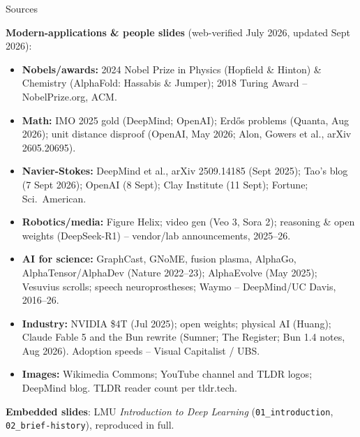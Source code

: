 \documentclass[aspectratio=43]{beamer}
\begin{document}
\begin{frame}{Sources}
  {\scriptsize
  \textbf{Modern-applications \& people slides} (web-verified July 2026, updated Sept 2026):
  \begin{itemize}\scriptsize
    \item \textbf{Nobels/awards:} 2024 Nobel Prize in Physics (Hopfield \& Hinton) \& Chemistry
      (AlphaFold: Hassabis \& Jumper); 2018 Turing Award -- NobelPrize.org, ACM.
    \item \textbf{Math:} IMO 2025 gold (DeepMind; OpenAI); Erd\H{o}s problems (Quanta, Aug
      2026); unit distance disproof (OpenAI, May 2026; Alon, Gowers et al., arXiv 2605.20695).
    \item \textbf{Navier-Stokes:} DeepMind et al., arXiv 2509.14185 (Sept 2025); Tao's blog
      (7 Sept 2026); OpenAI (8 Sept); Clay Institute (11 Sept); Fortune; Sci.\ American.
    \item \textbf{Robotics/media:} Figure Helix; video gen (Veo 3, Sora 2); reasoning \& open
      weights (DeepSeek-R1) -- vendor/lab announcements, 2025--26.
    \item \textbf{AI for science:} GraphCast, GNoME, fusion plasma, AlphaGo, AlphaTensor/AlphaDev
      (Nature 2022--23); AlphaEvolve (May 2025); Vesuvius scrolls; speech neuroprostheses;
      Waymo -- DeepMind/UC Davis, 2016--26.
    \item \textbf{Industry:} NVIDIA \$4T (Jul 2025); open weights; physical AI (Huang); Claude
      Fable 5 and the Bun rewrite (Sumner; The Register; Bun 1.4 notes, Aug 2026). Adoption
      speeds -- Visual Capitalist / UBS.
    \item \textbf{Images:} Wikimedia Commons; YouTube channel and TLDR logos; DeepMind blog.
      TLDR reader count per tldr.tech.
  \end{itemize}
  \vspace{0.3em}
  \textbf{Embedded slides}: LMU \emph{Introduction to Deep Learning}
  (\texttt{01\_introduction}, \texttt{02\_brief-history}), reproduced in full.}
\end{frame}
\end{document}
